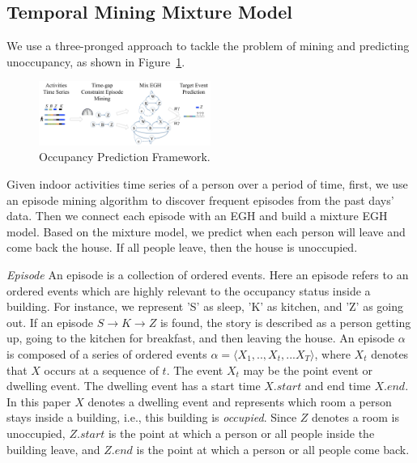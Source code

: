 \subsection{Temporal Mining Mixture Model}
We use a three-pronged approach to tackle the problem of mining and predicting unoccupancy, as 
shown in Figure~\ref{fig_framework}.
\begin{figure}[h]
\centering
\includegraphics[width=0.5\textwidth]{adlfigs/framework.pdf}
\caption{Occupancy Prediction Framework.\label{fig_framework}}
\end{figure}
Given indoor activities time series of a person over a period of time, 
first, we use an episode mining algorithm to discover frequent episodes from the past days' data. Then we connect each episode with an EGH and build a mixture EGH model. 
Based on the mixture model, we predict when each person will leave and come back the house. 
If all people leave, then the house is unoccupied. 


\textit{Episode} 
An episode is a collection of ordered events. 
Here an episode refers to an ordered events which are 
highly relevant to the occupancy status inside a building. 
For instance, we represent 'S' as sleep, 
'K' as kitchen, and 'Z' as going out. 
If an episode $S \rightarrow K \rightarrow Z$ is found, 
the story is described as a person getting up, 
going to the kitchen for breakfast, and then leaving the house. 
An episode $\alpha$ is composed 
of a series of ordered events
$\alpha=\langle X_1,..,X_t,...X_T \rangle$, 
where $X_t$ denotes that $X$ occurs at a sequence of $t$.  
The event $X_t$ may be the point event or dwelling event. 
The dwelling event
has a start time $X.start$ and end time $X.end$. 
In this paper  $X$ denotes a dwelling event and 
represents which room a person stays 
inside a building, i.e., this building is \emph{occupied}. 
Since $Z$ denotes a room is unoccupied, 
$Z.start$ is the point at which a person or all people inside the building leave, and 
$Z.end$ is the point at which a person or all people come back. 


